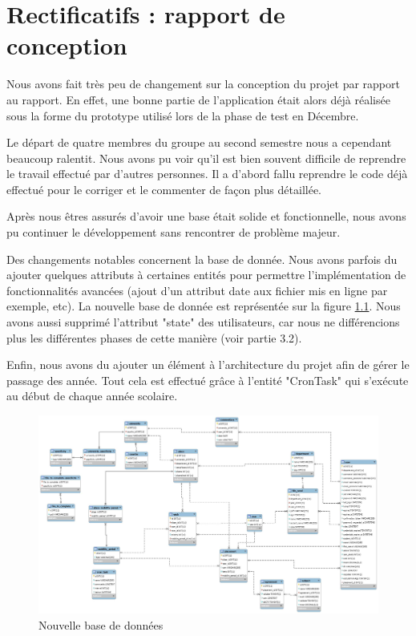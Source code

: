 \chapter{Rectificatifs : rapport de conception}

Nous avons fait très peu de changement sur la conception du projet par rapport au rapport. En effet, une bonne partie de l'application était alors déjà réalisée sous la forme du prototype utilisé lors de la phase de test en Décembre.

Le départ de quatre membres du groupe au second semestre nous a cependant beaucoup ralentit. Nous avons pu voir qu'il est bien souvent difficile de reprendre le travail effectué par d'autres personnes. Il a d'abord fallu reprendre le code déjà effectué pour le corriger et le commenter de façon plus détaillée.

Après nous êtres assurés d'avoir une base était solide et fonctionnelle, nous avons pu continuer le développement sans rencontrer de problème majeur. 

Des changements notables concernent la base de donnée. Nous avons parfois du ajouter quelques attributs à certaines entités pour permettre l'implémentation de fonctionnalités avancées (ajout d'un attribut date aux fichier mis en ligne par exemple, etc). La nouvelle base de donnée est représentée sur la figure \ref{bdd}. Nous avons aussi supprimé l'attribut "state" des utilisateurs, car nous ne différencions plus les différentes phases de cette manière (voir partie 3.2).

Enfin, nous avons du ajouter un élément à l'architecture du projet afin de gérer le passage des année. Tout cela est effectué grâce à l'entité "CronTask" qui s'exécute au début de chaque année scolaire.


\begin{figure}
	\centering
	\includegraphics[angle=90,scale=0.35]{images/screen_bdd.png}
	\caption{Nouvelle base de données}
	\label{bdd}
\end{figure}

